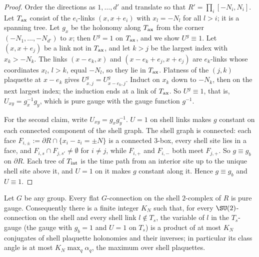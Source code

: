 \begin{proof}
Order the directions as $1,\dots,d'$ and translate so that $R'=\prod_i[-N_i,N_i]$. Let $T_{\rm ax}$ consist of the $e_i$-links $(x,x+e_i)$ with $x_l=-N_l$ for all $l>i$; it is a spanning tree. Let $g_x$ be the holonomy along $T_{\rm ax}$ from the corner $(-N_1,\dots,-N_{d'})$ to $x$; then $U^g=1$ on $T_{\rm ax}$, and we show $U^g\equiv1$. Let $(x,x+e_j)$ be a link not in $T_{\rm ax}$, and let $k>j$ be the largest index with $x_k>-N_k$. The links $(x-e_k,x)$ and $(x-e_k+e_j,x+e_j)$ are $e_k$-links whose coordinates $x_l$, $l>k$, equal $-N_l$, so they lie in $T_{\rm ax}$. Flatness of the $(j,k)$ plaquette at $x-e_k$ gives $U^g_{x,j}=U^g_{x-e_k,j}$. Induct on $x_k$ down to $-N_k$, then on the next largest index; the induction ends at a link of $T_{\rm ax}$. So $U^g\equiv1$, that is, $U_{xy}=g_x^{-1}g_y$, which is pure gauge with the gauge function $g^{-1}$.

For the second claim, write $U_{xy}=g_xg_y^{-1}$. $U=1$ on shell links makes $g$ constant on each connected component of the shell graph. The shell graph is connected: each face $F_{i,\pm}:=\partial R\cap\{x_i-z_i=\pm N\}$ is a connected $3$-box, every shell site lies in a face, and $F_{i,s}\cap F_{j,s'}\ne\emptyset$ for $i\ne j$, while $F_{i,+}$ and $F_{i,-}$ both meet $F_{j,+}$. So $g\equiv g_b$ on $\partial R$. Each tree of $T_{\rm int}$ is the time path from an interior site up to the unique shell site above it, and $U=1$ on it makes $g$ constant along it. Hence $g\equiv g_b$ and $U\equiv1$.
\end{proof}

\begin{lemma}\label{pf:lem-shell}
Let $G$ be any group. Every flat $G$-connection on the shell $2$-complex of $R$ is pure gauge. Consequently there is a finite integer $K_N$ such that, for every $\SU(2)$-connection on the shell and every shell link $l\notin T_s$, the variable of $l$ in the $T_s$-gauge (the gauge with $g_b=1$ and $U=1$ on $T_s$) is a product of at most $K_N$ conjugates of shell plaquette holonomies and their inverses; in particular its class angle is at most $K_N\max_q\alpha_q$, the maximum over shell plaquettes.
\end{lemma}

